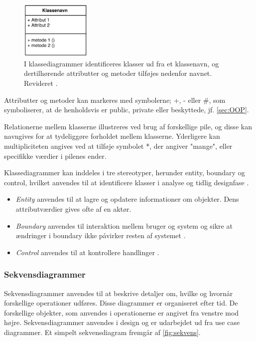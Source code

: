 \begin{figure} [H]
\centering
\includegraphics[width=0.3\textwidth]{figures/klassediag}
\caption{I klassediagrammer identificeres klasser ud fra et klassenavn, og dertilhørende attributter og metoder tilføjes nedenfor navnet. Revideret \cite{Fowler2004}.}
\label{fig:klassediagram}
\end{figure}

\noindent
Attributter og metoder kan markeres med symbolerne; +, - eller \#, som symboliserer, at de henholdsvis er public, private eller beskyttede, jf. \autoref{sec:OOP}.

Relationerne mellem klasserne illustreres ved brug af forskellige pile, og disse kan navngives for at tydeliggøre forholdet mellem  klasserne. Yderligere kan multipliciteten angives ved at tilføje symbolet *, der angiver "mange", eller specifikke værdier i pilenes ender. 

Klassediagrammer kan inddeles i tre stereotyper, herunder entity, boundary og control, hvilket anvendes til at identificere klasser i analyse og tidlig designfase \cite{RSC2002}.

\begin{itemize}
\item \textit{Entity} anvendes til at lagre og opdatere informationer om objekter. Dens attributværdier gives ofte af en aktør.\cite{RSC2002}
\item \textit{Boundary} anvendes til interaktion mellem bruger og system og sikre at ændringer i boundary ikke påvirker resten af systemet \cite{RSC2002}.
\item \textit{Control} anvendes til at kontrollere handlinger \cite{RSC2002}. 
\end{itemize}

\subsubsection{Sekvensdiagrammer}
Sekvensdiagrammer anvendes til at beskrive detaljer om, hvilke og hvornår forskellige operationer udføres. Disse diagrammer er organiseret efter tid. De forskellige objekter, som anvendes i operationerne er angivet fra venstre mod højre. Sekvensdiagrammer anvendes i design og er udarbejdet ud fra use case diagrammer.\cite{Brahma2015} Et simpelt sekvensdiagram fremgår af \autoref{fig:sekvens}.

